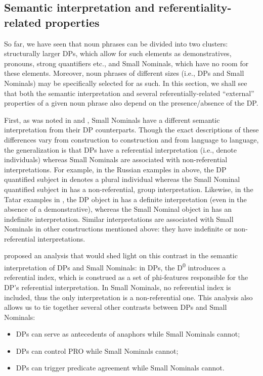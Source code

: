 \documentclass[output=paper]{langsci/langscibook}
\begin{document}
\subsection{Semantic interpretation and referentiality-related properties}  %

So far, we have seen that noun phrases can be divided into two clusters: 
structurally larger DPs, which allow for such elements as demonstratives, pronouns, strong quantifiers etc., 
and Small Nominals, which have no room for these elements. 
Moreover, noun phrases of different sizes (i.e., DPs and Small Nominals) may be specifically selected for as such. 
In this section, we shall see that both the semantic interpretation and several referentially-related “external” properties of a given noun phrase 
also depend on the presence/absence of the DP.

First, as was noted in \citet{Pereltsvaig2006} and \citet{LyutikovaPereltsvaig2015}, 
Small Nominals have a different semantic interpretation from their DP counterparts. 
Though the exact descriptions of these differences vary from construction to construction and from language to language, 
the generalization is that DPs have a referential interpretation (i.e., denote individuals) 
whereas Small Nominals are associated with non-referential interpretations. 
For example, in the Russian examples in  above, the DP quantified subject in  denotes a plural individual 
whereas the Small Nominal quantified subject in  has a non-referential, group interpretation. 
Likewise, in the Tatar examples in , the DP object in  has a definite interpretation (even in the absence of a demonstrative), 
whereas the Small Nominal object in  has an indefinite interpretation. 
Similar interpretations are associated with Small Nominals in other constructions mentioned above: 
they have indefinite or non-referential interpretations.

\citet{Pereltsvaig2001} proposed an analysis that would shed light on this contrast in the semantic interpretation of DPs and Small Nominals: 
in DPs, the D\textsuperscript{0} introduces a referential index, which is construed as a set of phi-features responsible for the DP’s referential interpretation. 
In Small Nominals, no referential index is included, thus the only interpretation is a non-referential one. 
This analysis also allows us to tie together several other contrasts between DPs and Small Nominals:

\begin{itemize}
\item DPs can serve as antecedents of anaphors while Small Nominals cannot;
\item DPs can control PRO while Small Nominals cannot;
\item DPs can trigger predicate agreement while Small Nominals cannot.
\end{itemize}
\end{document}
